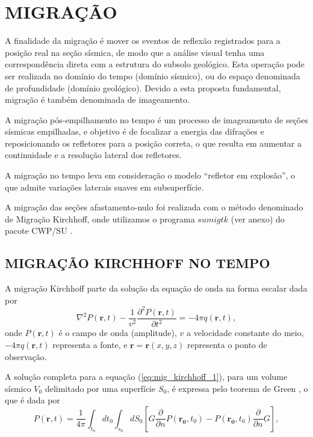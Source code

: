 \chapter{MIGRAÇÃO}
\label{cap3}

A finalidade da migração é mover os eventos de reflexão registrados para a posição real na seção sísmica, de modo que a análise visual tenha uma correspondência direta com a estrutura do subsolo geológico.  
Esta operação pode ser realizada no domínio do tempo (domínio sísmico), ou do espaço denominada de profundidade (domínio geológico).
Devido a esta proposta fundamental, migração é também denominada de imageamento. 

A migração pós-empilhamento no tempo é um processo de imageamento de seções sísmicas empilhadas, e  objetivo é de focalizar a energia das difrações e reposicionando os refletores para a posição correta, o que resulta em aumentar a continuidade e a resolução lateral dos refletores. 

A migração no tempo leva em consideração o modelo ``refletor em explosão'', o que admite variações laterais suaves em subsuperfície.  

A migração das seções afastamento-nulo foi realizada com o método denominado de Migração Kirchhoff, onde  utilizamos o programa $sumigtk$ (ver anexo) do pacote CWP/SU \citep{STOCKWELL(2017)}.

\section{MIGRAÇÃO KIRCHHOFF NO TEMPO}

A migração Kirchhoff parte da solução da equação de onda na forma escalar dada por
\begin{equation}
\nabla^2 P(\mathbf{r},t)-\frac{1}{v^2}\frac{\partial^2 P(\mathbf{r},t)}{\partial t^2}=-4\pi q(\mathbf{r},t),
\label{eq:mig_kirchhoff_1}
\end{equation}
onde $P(\mathbf{r},t)$ é o campo de onda (amplitude), $v$ a velocidade constante do meio, $-4\pi q(\mathbf{r},t)$ representa a fonte, e $\mathbf{r}=\mathbf{r}(x, y, z)$ representa o ponto de observação.

A solução completa para a equação (\ref{eq:mig_kirchhoff_1}), para um volume sísmico $V_0$ delimitado por uma superfície $S_0$, é expressa pelo teorema de Green \citep{Schneider(1978)}, o que é dada por
\begin{equation}
P(\mathbf{r},t)=\frac{1}{4\pi}\int_{t_{0}}dt_0\int_{s_{0}} dS_0 \left[G\frac{\partial}{\partial n}P(\mathbf{r_0},t_0)-P(\mathbf{r_0},t_0)\frac{\partial}{\partial n}G\right],
\label{eq:mig_kirchhoff_2}
\end{equation}

